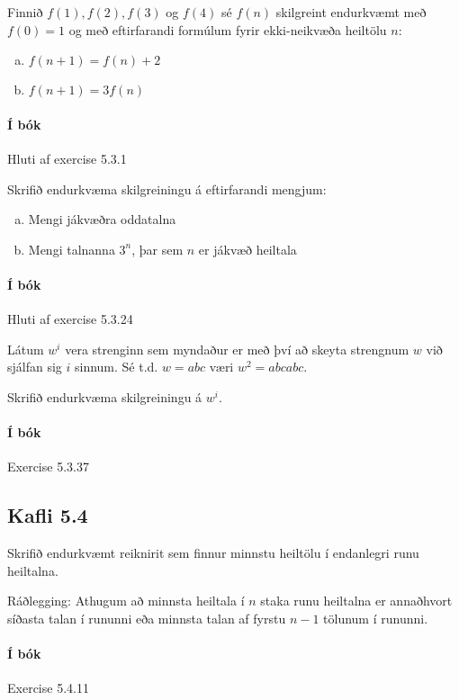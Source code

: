 \documentclass{exam}
\begin{document}
\begin{questions}

\question Finnið $f(1), f(2), f(3)$ og $f(4)$ sé $f(n)$ skilgreint endurkvæmt með $f(0) = 1$ og með eftirfarandi formúlum fyrir ekki-neikvæða heiltölu $n$:

\begin{enumerate}[a)]
 \item $f(n+1) = f(n)+2$
 \item $f(n+1) = 3f(n)$
\end{enumerate}

\paragraph{Í bók} Hluti af exercise 5.3.1

\question Skrifið endurkvæma skilgreiningu á eftirfarandi mengjum:

\begin{enumerate}[a)]
 \item Mengi jákvæðra oddatalna
 \item Mengi talnanna $3^n$, þar sem $n$ er jákvæð heiltala
\end{enumerate}

\paragraph{Í bók} Hluti af exercise 5.3.24

\question Látum $w^i$ vera strenginn sem myndaður er með því að skeyta strengnum $w$ við sjálfan sig $i$ sinnum. Sé t.d. $w = abc$ væri $w^2 = abcabc$.

Skrifið endurkvæma skilgreiningu á $w^i$.

\paragraph{Í bók} Exercise 5.3.37 

\subsection{Kafli 5.4}

\question Skrifið endurkvæmt reiknirit sem finnur minnstu heiltölu í endanlegri runu heiltalna.

Ráðlegging: Athugum að minnsta heiltala í $n$ staka runu heiltalna er annaðhvort síðasta talan í rununni eða minnsta talan af fyrstu $n - 1$ tölunum í rununni.

\paragraph{Í bók} Exercise 5.4.11


\end{questions}
\end{document}
